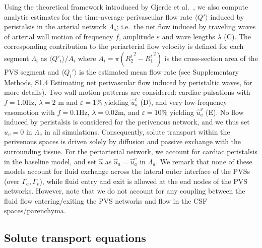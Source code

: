 \documentclass[fleqn,10pt]{wlscirep}
\begin{document}
Using the theoretical framework introduced by Gjerde et
al.~\cite{gjerde2023directional}, we also compute analytic estimates
for the time-average perivascular flow rate $\langle Q' \rangle$
induced by peristalsis in the arterial network $\Lambda_a$; i.e.~the
net flow induced by traveling waves of arterial wall motion of
frequency $f$, amplitude $\varepsilon$ and wave lengths $\lambda$
(C). The corresponding contribution to the periarterial
flow velocity is defined for each segment $\Lambda_i$ as $\langle Q'_i
\rangle/A_i$ where $A_i = \pi ({R_2^i}^2 - {R_1^i}^2)$ is the
cross-section area of the PVS segment and $\langle Q_i' \rangle$ is
the estimated mean flow rate (see Supplementary Methods, S1.4
Estimating net perivascular flow induced by peristaltic waves, for
more details). Two wall motion patterns are considered: cardiac
pulsations with $f = 1.0$Hz, $\lambda = 2$ m and $\varepsilon = 1\%$
yielding $\hat{u}_a^c$ (D), and very low-frequency
vasomotion with $f = 0.1$Hz, $\lambda = 0.02$m, and
$\varepsilon = 10\%$ yielding $\hat{u}_a^v$ (E). No flow
induced by peristalsis is considered for the perivenous network, and
we thus set $\hat{u}_v = 0$ in $\Lambda_v$ in all simulations. Consequently, 
solute transport within the perivenous spaces is driven solely by diffusion 
and passive exchange with the surrounding tissue. For
the periarterial network, we account for cardiac peristalsis in the
baseline model, and set $\hat{u}$ as $\hat{u}_a = \hat{u}_a^c$ in
$\Lambda_a$.  We remark that none of these models account for fluid
exchange across the lateral outer interface of the PVSs (over
$\Gamma_a, \Gamma_v$), while fluid entry and exit is allowed at the
end nodes of the PVS networks. However, note that we do not account
for any coupling between the fluid flow entering/exiting the PVS
networks and flow in the CSF spaces/parenchyma.

\subsection*{Solute transport equations}
\end{document}
